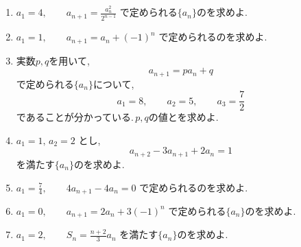 \begin{enumerate}[label=\textbf{問\arabic*.},leftmargin=3.8em,format=\bookitemlink{practice-basic}{problem}{answer}]
          \item $\displaystyle a_1=4,\qquad a_{n+1}=\frac{a_n^2}{2^{n-1}}$
                で定められる$\{a_n\}$のを求めよ.
          \item $\displaystyle a_1=1,\qquad a_{n+1}=a_n+(-1)^n$
                で定められるのを求めよ.
          \item 実数$p,q$を用いて,
                \[
                  a_{n+1}=pa_n+q
                \]
                で定められる$\{a_n\}$について,
                \[
                  a_1=8,\qquad a_2=5,\qquad a_3=\frac72
                \]
                であることが分かっている.\,$p,q$の値とを求めよ.
          \item $\displaystyle a_1=1,\,a_2=2$ とし,
                \[
                  a_{n+2}-3a_{n+1}+2a_n=1
                \]
                を満たす$\{a_n\}$のを求めよ.
          \item $\displaystyle a_1=\frac74,\qquad 4a_{n+1}-4a_n=0$
                で定められるのを求めよ.
          \item $\displaystyle a_1=0,\qquad a_{n+1}=2a_n+3(-1)^n$
                で定められる$\{a_n\}$のを求めよ.
          \item $\displaystyle a_1=2,\qquad S_n=\frac{n+2}{3}a_n$
                                を満たす$\{a_n\}$のを求めよ.
        \end{enumerate}

